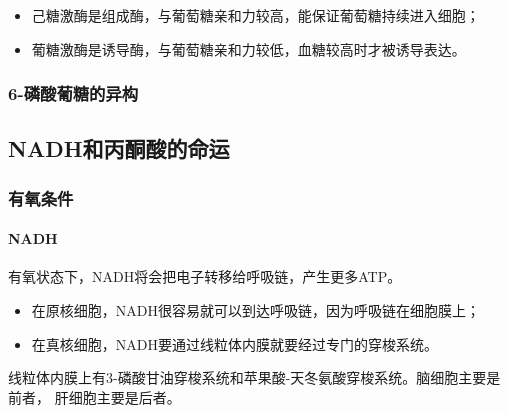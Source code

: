 \begin{itemize}
	\item 己糖激酶是组成酶，与葡萄糖亲和力较高，能保证葡萄糖持续进入细胞；
	\item 葡糖激酶是诱导酶，与葡萄糖亲和力较低，血糖较高时才被诱导表达。
\end{itemize}

\subsubsection{6-磷酸葡糖的异构}

\begin{center}
\end{center}

\subsection{NADH和丙酮酸的命运}

\subsubsection{有氧条件}

\paragraph{NADH}

有氧状态下，NADH将会把电子转移给呼吸链，产生更多ATP。
\begin{itemize}
	\item 在原核细胞，NADH很容易就可以到达呼吸链，因为呼吸链在细胞膜上；
	\item 在真核细胞，NADH要通过线粒体内膜就要经过专门的穿梭系统。
\end{itemize}

线粒体内膜上有3-磷酸甘油穿梭系统和苹果酸-天冬氨酸穿梭系统。脑细胞主要是前者， 肝细胞主要是后者。

